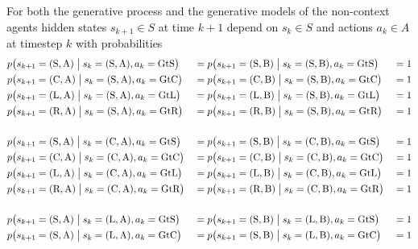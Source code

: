 For both the generative process and the generative models of the non-context agents hidden states \(s_{k+1} \in S\) at time \(k+1\) depend on \(s_k \in S\) and actions \(a_k \in A\) at timestep \(k\) with probabilities
\begin{alignat}{3}
     & p\bigl(s_{k+1}=(\text{S},\text{A})\bigm|s_k=(\text{S},\text{A}),a_k=\text{GtS}\bigr) &  & =p\bigl(s_{k+1}=(\text{S},\text{B})\bigm|s_k=(\text{S},\text{B}),a_k=\text{GtS}\bigr) &  & = 1 \nonumber \\
     & p\bigl(s_{k+1}=(\text{C},\text{A})\bigm|s_k=(\text{S},\text{A}),a_k=\text{GtC}\bigr) &  & =p\bigl(s_{k+1}=(\text{C},\text{B})\bigm|s_k=(\text{S},\text{B}),a_k=\text{GtC}\bigr) &  & = 1 \nonumber \\
     & p\bigl(s_{k+1}=(\text{L},\text{A})\bigm|s_k=(\text{S},\text{A}),a_k=\text{GtL}\bigr) &  & =p\bigl(s_{k+1}=(\text{L},\text{B})\bigm|s_k=(\text{S},\text{B}),a_k=\text{GtL}\bigr) &  & = 1 \nonumber \\
     & p\bigl(s_{k+1}=(\text{R},\text{A})\bigm|s_k=(\text{S},\text{A}),a_k=\text{GtR}\bigr) &  & =p\bigl(s_{k+1}=(\text{R},\text{B})\bigm|s_k=(\text{S},\text{B}),a_k=\text{GtR}\bigr) &  & = 1 \nonumber \\[1.5em]
     & p\bigl(s_{k+1}=(\text{S},\text{A})\bigm|s_k=(\text{C},\text{A}),a_k=\text{GtS}\bigr) &  & =p\bigl(s_{k+1}=(\text{S},\text{B})\bigm|s_k=(\text{C},\text{B}),a_k=\text{GtS}\bigr) &  & = 1 \nonumber \\
     & p\bigl(s_{k+1}=(\text{C},\text{A})\bigm|s_k=(\text{C},\text{A}),a_k=\text{GtC}\bigr) &  & =p\bigl(s_{k+1}=(\text{C},\text{B})\bigm|s_k=(\text{C},\text{B}),a_k=\text{GtC}\bigr) &  & = 1 \nonumber \\
     & p\bigl(s_{k+1}=(\text{L},\text{A})\bigm|s_k=(\text{C},\text{A}),a_k=\text{GtL}\bigr) &  & =p\bigl(s_{k+1}=(\text{L},\text{B})\bigm|s_k=(\text{C},\text{B}),a_k=\text{GtL}\bigr) &  & = 1 \nonumber \\
     & p\bigl(s_{k+1}=(\text{R},\text{A})\bigm|s_k=(\text{C},\text{A}),a_k=\text{GtR}\bigr) &  & =p\bigl(s_{k+1}=(\text{R},\text{B})\bigm|s_k=(\text{C},\text{B}),a_k=\text{GtR}\bigr) &  & = 1 \nonumber \\[1.5em]
     & p\bigl(s_{k+1}=(\text{S},\text{A})\bigm|s_k=(\text{L},\text{A}),a_k=\text{GtS}\bigr) &  & =p\bigl(s_{k+1}=(\text{S},\text{B})\bigm|s_k=(\text{L},\text{B}),a_k=\text{GtS}\bigr) &  & = 1 \nonumber \\
     & p\bigl(s_{k+1}=(\text{S},\text{A})\bigm|s_k=(\text{L},\text{A}),a_k=\text{GtC}\bigr) &  & =p\bigl(s_{k+1}=(\text{S},\text{B})\bigm|s_k=(\text{L},\text{B}),a_k=\text{GtC}\bigr) &  & = 1 \nonumber \\

\end{alignat}
